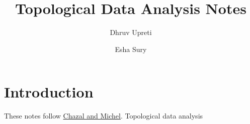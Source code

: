 \documentclass{article}
\begin{document}
\title{Topological Data Analysis Notes}
\author{Dhruv Upreti \and Esha Sury}
\maketitle

\section*{Introduction}

These notes follow \href{https://arxiv.org/abs/1710.04019}{Chazal and Michel}. Topological data analysis 
\end{document}
